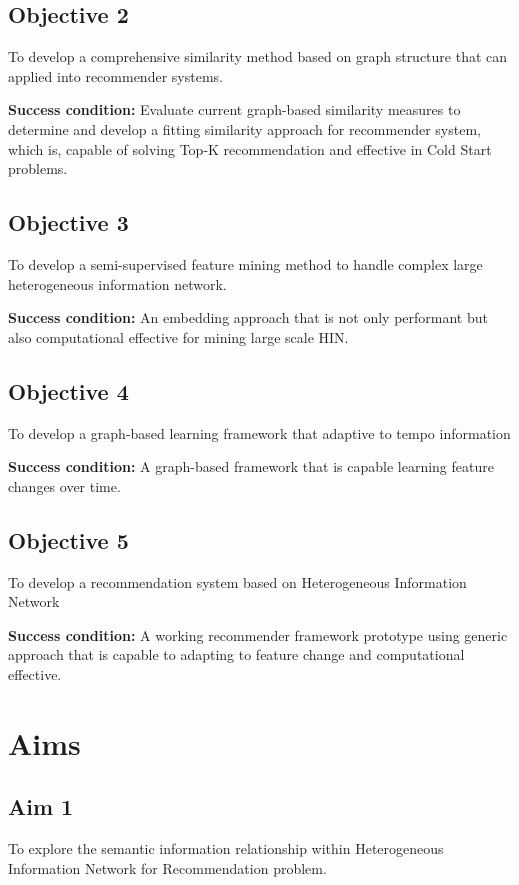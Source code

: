 \subsection*{Objective 2} 
To develop a comprehensive similarity method based on graph structure that can applied into recommender systems. 

\textbf{Success condition:} Evaluate current graph-based similarity measures to determine and develop a fitting similarity approach for recommender system, which is, capable of solving Top-K recommendation and effective in Cold Start problems. 

\subsection*{Objective 3}
To develop a semi-supervised feature mining method to handle complex large heterogeneous information network. 

\textbf{Success condition:} An embedding approach that is not only performant but also computational effective for mining large scale HIN. 

\subsection*{Objective 4} 
To develop a graph-based learning framework that adaptive to tempo information 

\textbf{Success condition:} A graph-based framework that is capable learning feature changes over time. 

\subsection*{Objective 5} 
To develop a recommendation system based on Heterogeneous Information Network 

\textbf{Success condition:} A working recommender framework prototype using generic approach that is capable to  adapting to feature change and computational effective.  

\newpage

\section{Aims}
\subsection{Aim 1}
To explore the semantic information relationship within Heterogeneous Information Network for Recommendation problem.

